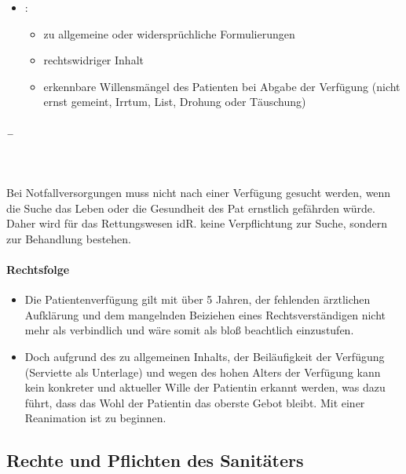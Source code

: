 \begin{itemize}
	\item {\mdseries
	:}


	\begin{itemize}
		\item {\mdseries
		zu allgemeine oder widerspr\"uchliche Formulierungen}

		\item {\mdseries
		rechtswidriger Inhalt}

		\item {\mdseries
		erkennbare Willensmängel des Patienten bei Abgabe der
		Verf\"ugung (nicht ernst gemeint, Irrtum, List, Drohung oder Täuschung)}
	\end{itemize}
\end{itemize}

\subparagraph*{ --
}~

Bei Notfallversorgungen muss nicht nach einer Verf\"ugung gesucht
werden, wenn die Suche das Leben oder die Gesundheit des Pat ernstlich
gefährden w\"urde. Daher wird f\"ur das Rettungswesen idR. keine
Verpflichtung zur Suche, sondern zur Behandlung bestehen.


\paragraph*{Rechtsfolge}

\begin{itemize}
	\item {\mdseries\color[rgb]{0.0,0.0,0.5019608}
	Die Patientenverf\"ugung gilt mit \"uber 5 Jahren, der fehlenden
	ärztlichen Aufklärung und dem mangelnden Beiziehen eines
	Rechtsverständigen nicht mehr als verbindlich und wäre somit als
	blo{\ss} beachtlich einzustufen. }

	\item {\mdseries\color[rgb]{0.0,0.0,0.5019608}
	Doch aufgrund des zu allgemeinen Inhalts, der Beiläufigkeit der
	Verf\"ugung (Serviette als Unterlage) und wegen des hohen Alters der
	Verf\"ugung kann kein konkreter und aktueller Wille der
	Patientin erkannt werden, was dazu f\"uhrt, dass das Wohl
	der Patientin das oberste Gebot bleibt. Mit einer
	Reanimation ist zu beginnen.}

\end{itemize}

\subsection{Rechte und Pflichten des Sanitäters}

